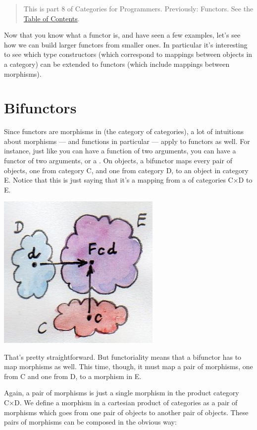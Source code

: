 \begin{quote}
This is part 8 of Categories for Programmers. Previously: {Functors}.
See the
\href{https://bartoszmilewski.com/2014/10/28/category-theory-for-programmers-the-preface/}{Table
of Contents}.
\end{quote}

Now that you know what a functor is, and have seen a few examples, let's
see how we can build larger functors from smaller ones. In particular
it's interesting to see which type constructors (which correspond to
mappings between objects in a category) can be extended to functors
(which include mappings between morphisms).

\section{Bifunctors}\label{bifunctors}

Since functors are morphisms in  (the category of categories),
a lot of intuitions about morphisms --- and functions in particular ---
apply to functors as well. For instance, just like you can have a
function of two arguments, you can have a functor of two arguments, or a
. On objects, a bifunctor maps every pair of objects,
one from category C, and one from category D, to an object in category
E. Notice that this is just saying that it's a mapping from a
 of categories C×D to E.

\includegraphics[width=3.12500in]{images/bifunctor.jpg}

That's pretty straightforward. But functoriality means that a bifunctor
has to map morphisms as well. This time, though, it must map a pair of
morphisms, one from C and one from D, to a morphism in E.

Again, a pair of morphisms is just a single morphism in the product
category C×D. We define a morphism in a cartesian product of categories
as a pair of morphisms which goes from one pair of objects to another
pair of objects. These pairs of morphisms can be composed in the obvious
way:

